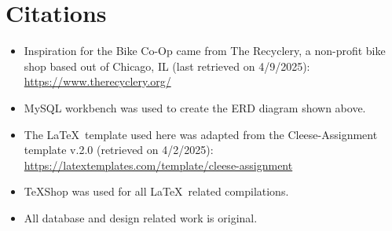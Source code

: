 \documentclass{article}
\begin{document}
\section{Citations}
\begin{tcolorbox}[colback=secondarycolor, colframe=primarycolor, arc=5mm]
\begin{itemize}
  \item Inspiration for the Bike Co-Op came from The Recyclery, a non-profit bike shop based out of Chicago, IL (last retrieved on 4/9/2025): \href{https://www.therecyclery.org/}{https://www.therecyclery.org/}
  
  \vspace{0.2cm}
  
  \item MySQL workbench was used to create the ERD diagram shown above.
  
  \vspace{0.2cm}
  
  \item The \LaTeX\ template used here was adapted from the Cleese-Assignment template v.2.0 (retrieved on 4/2/2025): \href{https://latextemplates.com/template/cleese-assignment}{https://latextemplates.com/template/cleese-assignment}
  
  \vspace{0.2cm}
  
  \item TeXShop was used for all \LaTeX\ related compilations.
  
  \vspace{0.2cm}
  
  \item All database and design related work is original.
\end{itemize}
\end{tcolorbox}
\end{document}
